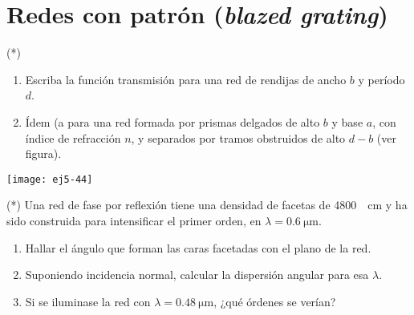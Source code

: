 \section*{Redes con patrón (\emph{blazed grating})}

\item (*)
\begin{minipage}[t][1.7cm]{0.85\textwidth}
\begin{enumerate}
	\item Escriba la función transmisión para una red de rendijas de ancho $b$ y período $d$.
	\item Ídem (a para una red formada por prismas delgados de alto $b$ y base $a$, con índice de refracción $n$, y separados por tramos obstruidos de alto $d-b$ (ver figura). 
\end{enumerate}
\end{minipage}
\begin{minipage}[c][2cm][t]{0.1\textwidth}
	\texttt{[image: ej5-44]}
\end{minipage}



\item (*) Una red de fase por reflexión tiene una densidad de facetas de \SI{4800}{\per\centi\metre} y ha sido construida para intensificar el primer orden, en $\lambda = \SI{0.6}{\micro\metre}$.
\begin{enumerate}
	\item Hallar el ángulo que forman las caras facetadas con el plano de la red. 
	\item Suponiendo incidencia normal, calcular la dispersión angular para esa $\lambda$. 
	\item Si se iluminase la red con $\lambda = \SI{0.48}{\micro\metre}$, ¿qué órdenes se verían?
\end{enumerate}




